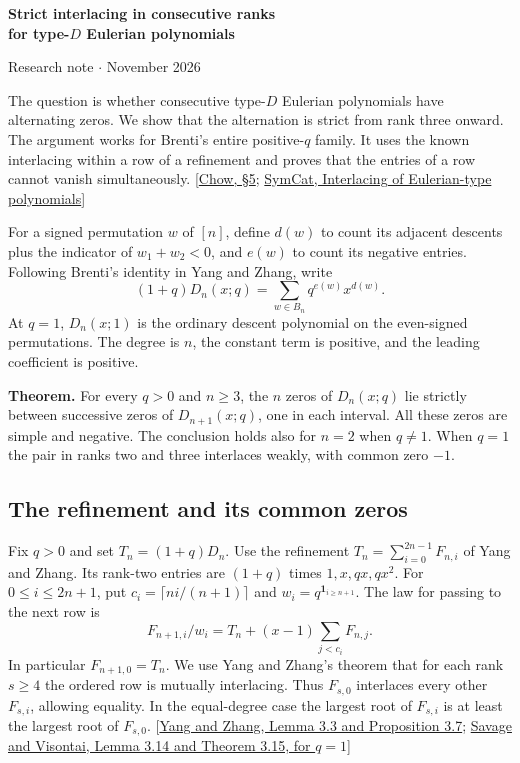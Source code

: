 \documentclass[11pt]{article}
\begin{document}
\begin{center}{\Large\bfseries Strict interlacing in consecutive ranks\\ for type-$D$ Eulerian polynomials}\par
\small Research note \enspace$\cdot$ November 2026\end{center}

The question is whether consecutive type-$D$ Eulerian polynomials have alternating zeros. We show that the alternation is strict from rank three onward. The argument works for Brenti's entire positive-$q$ family. It uses the known interlacing within a row of a refinement and proves that the entries of a row cannot vanish simultaneously. [\href{https://doi.org/10.1016/j.jmaa.2022.126019}{Chow, \S5}; \href{https://www.symmetricfunctions.com/realRootedOpenProblems.htm}{SymCat, Interlacing of Eulerian-type polynomials}]

For a signed permutation $w$ of $[n]$, define $d(w)$ to count its adjacent descents plus the indicator of $w_1+w_2<0$, and $e(w)$ to count its negative entries. Following Brenti's identity in Yang and Zhang, write
\[
 (1+q)D_n(x;q)=\sum_{w\in B_n}q^{e(w)}x^{d(w)}.
\]
At $q=1$, $D_n(x;1)$ is the ordinary descent polynomial on the even-signed permutations. The degree is $n$, the constant term is positive, and the leading coefficient is positive.

\textbf{Theorem.} For every $q>0$ and $n\ge3$, the $n$ zeros of $D_n(x;q)$ lie strictly between successive zeros of $D_{n+1}(x;q)$, one in each interval. All these zeros are simple and negative. The conclusion holds also for $n=2$ when $q\ne1$. When $q=1$ the pair in ranks two and three interlaces weakly, with common zero $-1$.

\subsection*{The refinement and its common zeros}
Fix $q>0$ and set $T_n=(1+q)D_n$. Use the refinement $T_n=\sum_{i=0}^{2n-1}F_{n,i}$ of Yang and Zhang. Its rank-two entries are $(1+q)$ times $1,x,qx,qx^2$. For $0\le i\le 2n+1$, put $c_i=\lceil ni/(n+1)\rceil$ and $w_i=q^{\mathbf1_{i\ge n+1}}$. The law for passing to the next row is
\[
 F_{n+1,i}/w_i=T_n+(x-1)\sum_{j<c_i}F_{n,j}.
 \tag{1}
\]
In particular $F_{n+1,0}=T_n$. We use Yang and Zhang's theorem that for each rank $s\ge4$ the ordered row is mutually interlacing. Thus $F_{s,0}$ interlaces every other $F_{s,i}$, allowing equality. In the equal-degree case the largest root of $F_{s,i}$ is at least the largest root of $F_{s,0}$. [\href{https://arxiv.org/abs/1401.6273}{Yang and Zhang, Lemma 3.3 and Proposition 3.7}; \href{https://arxiv.org/abs/1208.3831}{Savage and Visontai, Lemma 3.14 and Theorem 3.15, for $q=1$}]
\end{document}
